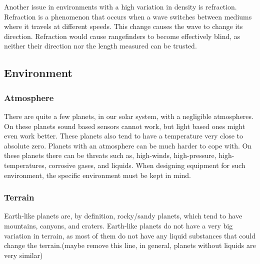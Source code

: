 Another issue in environments with a high variation in density is refraction. Refraction is a phenomenon that occurs when a wave switches between mediums where it travels at different speeds. This change causes the wave to change its direction. %
Refraction would cause rangefinders to become effectively blind, as neither their direction nor the length measured can be trusted.

\clearpage
\subsection{Environment}
\subsubsection{Atmosphere}
There are quite a few planets, in our solar system, with a negligible atmospheres. On these planets sound based sensors cannot work, but light based ones might even work better. These planets also tend to have a temperature very close to absolute zero\cite{planetstemp}.
Planets with an atmosphere can be much harder to cope with. On these planets there can be threats such as, high-winds, high-pressure, high-temperatures, corrosive gases, and liquids. When designing equipment for such environment, the specific environment must be kept in mind.

\subsubsection{Terrain}
Earth-like planets are, by definition, rocky/sandy planets, which tend to have mountains, canyons, and craters.
Earth-like planets do not have a very big variation in terrain, as most of them do not have any liquid substances that could change the terrain.(maybe remove this line, in general, planets without liquids are very similar)

